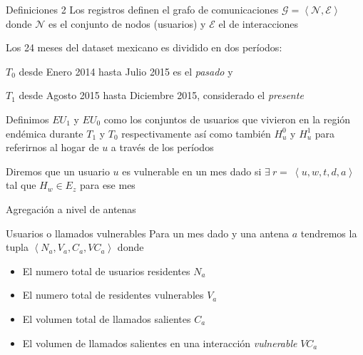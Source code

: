 \documentclass[xcolor=x11names]{beamer}
\def\calE{\mathcal{E}}
\def\calG{\mathcal{G}}
\def\calN{\mathcal{N}}
\begin{document}
\begin{frame}{Definiciones 2}
	Los registros definen el grafo de comunicaciones
	$\calG = \left< \calN, \calE \right> $ donde $\calN$ es el conjunto de nodos (usuarios) y $\calE$ el de interacciones

	\medskip
	Los 24 meses del dataset mexicano es dividido en dos períodos:
	\begin{enumerate*}[label={\alph*)},]
			\item $T_0$ desde Enero 2014 hasta Julio 2015 es el \textit{pasado} y
			\item $T_1$ desde Agosto 2015 hasta Diciembre 2015, considerado el \textit{presente}
	\end{enumerate*}

	\medskip
	Definimos $EU_{1}$ y $EU_{0}$ como los conjuntos de usuarios que vivieron en la región endémica durante $T_1$ y $T_0$ respectivamente así como también $H^0_u$ y $H^1_u$ para referirnos al hogar de $u$ a través de los períodos

	\medskip
	Diremos que un usuario $u$ es vulnerable en un mes dado si $\exists \ r = \ \left < u, w, t, d, a \right > $ tal que $H_w \in E_z$ para ese mes

\end{frame}




\begin{frame}{Agregación a nivel de antenas}

	\begin{block}{Usuarios  o llamados vulnerables}
	Para un mes dado y una antena $a$ tendremos la tupla $\left< N_a, V_a, C_a, VC_a \right>$ donde
		\begin{itemize}
			\item El numero total de usuarios residentes $N_a$
			\item El numero total de residentes vulnerables $V_a$
			\item El volumen total de llamados salientes $C_a$
			\item El volumen de llamados salientes en una interacción \textit{vulnerable} $VC_a$
		\end{itemize}
	\end{block}
\end{frame}
\end{document}
